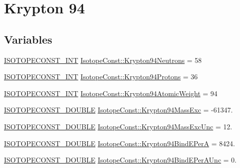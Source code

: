\hypertarget{group___isotope_const-_krypton-_kr94}{}\section{Krypton 94}
\label{group___isotope_const-_krypton-_kr94}
\subsection*{Variables}
\begin{DoxyCompactItemize}
\item 
\mbox{\hyperlink{group___isotope_const-_macros_ga5f18360b3e99483a35c32d789e62621c}{I\+S\+O\+T\+O\+P\+E\+C\+O\+N\+S\+T\+\_\+\+I\+NT}} \mbox{\hyperlink{group___isotope_const-_krypton-_kr94_ga959180530ee9fbb61c4c66186e0fd08a}{Isotope\+Const\+::\+Krypton94\+Neutrons}} = 58
\item 
\mbox{\hyperlink{group___isotope_const-_macros_ga5f18360b3e99483a35c32d789e62621c}{I\+S\+O\+T\+O\+P\+E\+C\+O\+N\+S\+T\+\_\+\+I\+NT}} \mbox{\hyperlink{group___isotope_const-_krypton-_kr94_gaf2f9950b659fda8959bd5f65b52375c1}{Isotope\+Const\+::\+Krypton94\+Protons}} = 36
\item 
\mbox{\hyperlink{group___isotope_const-_macros_ga5f18360b3e99483a35c32d789e62621c}{I\+S\+O\+T\+O\+P\+E\+C\+O\+N\+S\+T\+\_\+\+I\+NT}} \mbox{\hyperlink{group___isotope_const-_krypton-_kr94_gaf8db32d2f490cd3092156830fd2d0765}{Isotope\+Const\+::\+Krypton94\+Atomic\+Weight}} = 94
\item 
\mbox{\hyperlink{group___isotope_const-_macros_ga8f45a7272ce02c0b4c65c44636ed719a}{I\+S\+O\+T\+O\+P\+E\+C\+O\+N\+S\+T\+\_\+\+D\+O\+U\+B\+LE}} \mbox{\hyperlink{group___isotope_const-_krypton-_kr94_gac9dda00cda67615c0364937d2f1cd45b}{Isotope\+Const\+::\+Krypton94\+Mass\+Exc}} = -\/61347.
\item 
\mbox{\hyperlink{group___isotope_const-_macros_ga8f45a7272ce02c0b4c65c44636ed719a}{I\+S\+O\+T\+O\+P\+E\+C\+O\+N\+S\+T\+\_\+\+D\+O\+U\+B\+LE}} \mbox{\hyperlink{group___isotope_const-_krypton-_kr94_gac9529ec7b09b1bfcac288ea26712cf9c}{Isotope\+Const\+::\+Krypton94\+Mass\+Exc\+Unc}} = 12.
\item 
\mbox{\hyperlink{group___isotope_const-_macros_ga8f45a7272ce02c0b4c65c44636ed719a}{I\+S\+O\+T\+O\+P\+E\+C\+O\+N\+S\+T\+\_\+\+D\+O\+U\+B\+LE}} \mbox{\hyperlink{group___isotope_const-_krypton-_kr94_gafef054fdff41f92eb301e0fedb7d5e0e}{Isotope\+Const\+::\+Krypton94\+Bind\+E\+PerA}} = 8424.
\item 
\mbox{\hyperlink{group___isotope_const-_macros_ga8f45a7272ce02c0b4c65c44636ed719a}{I\+S\+O\+T\+O\+P\+E\+C\+O\+N\+S\+T\+\_\+\+D\+O\+U\+B\+LE}} \mbox{\hyperlink{group___isotope_const-_krypton-_kr94_gacde04c1325836fed1f131c7b91cd2b44}{Isotope\+Const\+::\+Krypton94\+Bind\+E\+Per\+A\+Unc}} = 0.

\end{DoxyCompactItemize}
